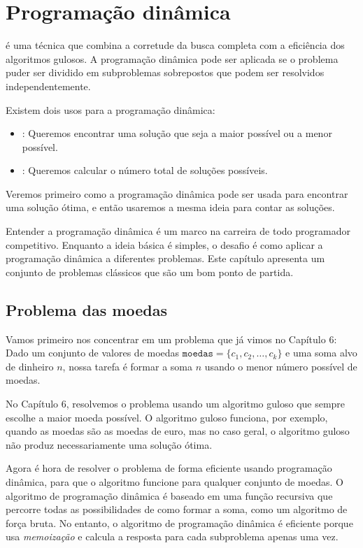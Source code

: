 \chapter{Programação dinâmica}


 é uma técnica que combina a corretude
da busca completa com a eficiência
dos algoritmos gulosos. A programação dinâmica pode ser aplicada se o
problema puder ser dividido em subproblemas sobrepostos
que podem ser resolvidos independentemente.

Existem dois usos para a programação dinâmica:

\begin{itemize}
\item
{}:
Queremos encontrar uma solução que seja
a maior possível ou a menor possível.
\item
{}:
Queremos calcular o número total de
soluções possíveis.
\end{itemize}

Veremos primeiro como a programação dinâmica pode
ser usada para encontrar uma solução ótima,
e então usaremos a mesma ideia para
contar as soluções.

Entender a programação dinâmica é um marco
na carreira de todo programador competitivo.
Enquanto a ideia básica é simples,
o desafio é como aplicar
a programação dinâmica a diferentes problemas.
Este capítulo apresenta um conjunto de problemas clássicos
que são um bom ponto de partida.

\section{Problema das moedas}

Vamos primeiro nos concentrar em um problema que
já vimos no Capítulo 6:
Dado um conjunto de valores de moedas $\texttt{moedas} = \{c_1,c_2,\ldots,c_k\}$
e uma soma alvo de dinheiro $n$, nossa tarefa é
formar a soma $n$ usando o menor número possível de moedas.

No Capítulo 6, resolvemos o problema usando um
algoritmo guloso que sempre escolhe a maior
moeda possível.
O algoritmo guloso funciona, por exemplo,
quando as moedas são as moedas de euro,
mas no caso geral, o algoritmo guloso
não produz necessariamente uma solução ótima.

Agora é hora de resolver o problema de forma eficiente
usando programação dinâmica, para que o algoritmo
funcione para qualquer conjunto de moedas.
O algoritmo de programação dinâmica é baseado em uma função recursiva
que percorre todas as possibilidades de como
formar a soma, como um algoritmo de força bruta.
No entanto, o algoritmo de programação dinâmica
é eficiente porque
usa \emph{memoização} e
calcula a resposta para cada subproblema apenas uma vez.

